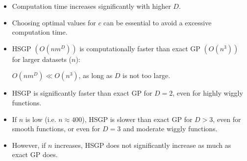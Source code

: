 \documentclass[8pt]{beamer} %
\begin{document}
\begin{frame}[t]
\vspace{-4mm}
\begin{itemize}\setlength\itemsep{1mm}
\small
\item Computation time increases significantly with higher $D$. 
\item Choosing optimal values for $c$ can be essential to avoid a excessive computation time. 
\end{itemize}

\centering
\begin{tcolorbox}[colframe=blue!20, colback=white, title={\small On time of computation}, colbacktitle=lightblue, coltitle=black, boxrule=0.5pt, right=1mm, left=1mm, width=0.99\textwidth]
\begin{itemize}\setlength\itemsep{2mm}
\small
\item HSGP $\left(O(nm^D)\right)$ is computationally faster than exact GP $\left(O(n^3)\right)$ for larger datasets ($n$):

{\centering $O(nm^D) \ll O(n^3)$, as long as $D$ is not too large.} %

\item HSGP is significantly faster than exact GP for $D=2$, even for highly wiggly functions. 

\item If $n$ is low (i.e. $n\approx 400$), HSGP is slower than exact GP for $D>3$, even for smooth functions, or even for $D=3$ and moderate wiggly functions.

\item However, if $n$ increases, HSGP does not significantly increase as much as exact GP does.

\end{itemize}
\end{tcolorbox}
\end{frame}
\end{document}
